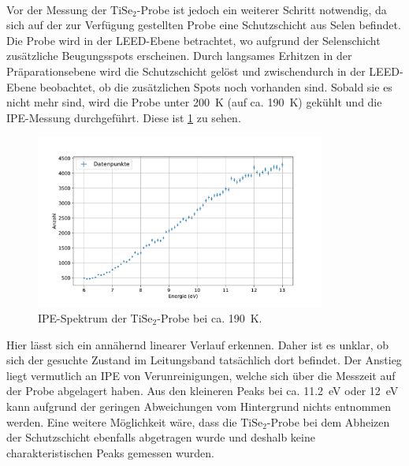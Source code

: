 \

Vor der Messung der $\text{TiSe}_2$-Probe ist jedoch ein weiterer Schritt notwendig, da sich auf der zur Verfügung gestellten Probe eine Schutzschicht aus Selen befindet.
Die Probe wird in der LEED-Ebene betrachtet, wo aufgrund der Selenschicht zusätzliche Beugungsspots erscheinen.
Durch langsames Erhitzen in der Präparationsebene wird die Schutzschicht gelöst und zwischendurch in der LEED-Ebene beobachtet, ob die zusätzlichen Spots noch vorhanden sind.
Sobald sie es nicht mehr sind, wird die Probe unter \SI{200}{\kelvin} (auf ca. \SI{190}{\kelvin}) gekühlt und die IPE-Messung durchgeführt.
Diese ist \cref{fig_ipe_thighs2} zu sehen.
\begin{figure}[!ht]
    \centering
    \includegraphics[width=0.85\textwidth]{plots/TiSe2.pdf}
    \caption{IPE-Spektrum der $\text{TiSe}_2$-Probe bei ca. \SI{190}{\kelvin}.}
    \label{fig_ipe_thighs2}
\end{figure}
Hier lässt sich ein annähernd linearer Verlauf erkennen.
Daher ist es unklar, ob sich der gesuchte Zustand im Leitungsband tatsächlich dort befindet.
Der Anstieg liegt vermutlich an IPE von Verunreinigungen, welche sich über die Messzeit auf der Probe abgelagert haben.
Aus den kleineren Peaks bei ca. \SI{11.2}{\electronvolt} oder \SI{12}{\electronvolt} kann aufgrund der geringen Abweichungen vom Hintergrund nichts entnommen werden.
Eine weitere Möglichkeit wäre, dass die $\text{TiSe}_2$-Probe bei dem Abheizen der Schutzschicht ebenfalls abgetragen wurde und deshalb keine charakteristischen Peaks gemessen wurden.




